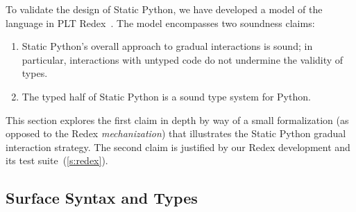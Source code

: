 \documentclass[english,cleveref,submission]{programming}
\newcommand{\SP}{Static Python}
\begin{document}
To validate the design of \SP{}, we have developed a model of the language in PLT
Redex~\cite{kcdeffmrtf-popl-2012}.
The model encompasses two soundness claims:
\begin{enumerate}
  \item
    \SP{}'s overall approach to gradual interactions is sound; in particular,
    interactions with untyped code do not undermine the validity of types.
  \item
    The typed half of \SP{} is a sound type system for Python.
\end{enumerate}
This section explores the first claim in depth by way of a small formalization
(as opposed to the Redex \emph{mechanization})
that illustrates the \SP{} gradual interaction strategy.
The second claim is justified by our Redex development and its test suite~(\cref{s:redex}).


\subsection{Surface Syntax and Types}
\end{document}
